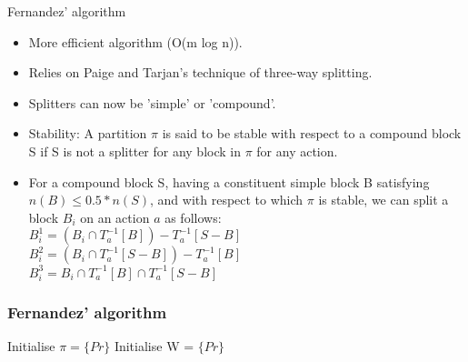 \documentclass{beamer}
\begin{document}
    
    

\begin{frame}{Fernandez' algorithm}
  \begin{itemize}
  \item More efficient algorithm (O(m log n)).
  \item Relies on Paige and Tarjan's technique of three-way splitting.
  \item Splitters can now be 'simple' or 'compound'.
  \item Stability: A partition $\pi$ is said to be stable with respect to a
    compound block S if S is not a splitter for any block in $\pi$ for
    any action.
  \item For a compound block S, having a constituent simple block B
    satisfying $n(B) \le 0.5*n(S)$, and with respect to which $\pi$ is
    stable, we can split a block $B_i$ on an action $a$ as follows:\\
    $B_i^1 = (B_i \cap T_a^{-1}[B]) - T_a^{-1}[S-B]$ \\
    $B_i^2 = (B_i \cap T_a^{-1}[S-B]) - T_a^{-1}[B]$ \\
    $B_i^3 = B_i \cap T_a^{-1}[B] \cap T_a^{-1}[S-B]$ \\
  \end{itemize}
\end{frame}

\begin{frame}[fragile]

  \frametitle{Fernandez' algorithm}
  \begin{algorithm2e}[H]
    Initialise $\pi = \{Pr\}$\;
    Initialise W = $\{Pr\}$
  \end{algorithm2e}
\end{frame}
\end{document}
